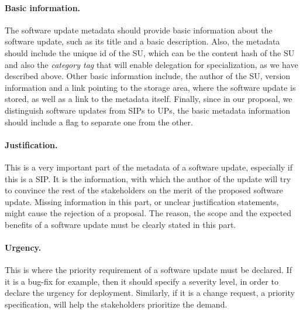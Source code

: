 \paragraph{Basic information.}The software update metadata should provide basic information about the software update, such as its title and a basic description. Also, the metadata should include the unique id of the SU, which can be the content hash of the SU and also the \emph{category tag} that will enable delegation for specialization, as we have described above. Other basic information include, the author of the SU, version information and a link pointing to the storage area, where the software update is stored, as well as a link to the metadata itself. Finally, since in our proposal, we distinguish software updates from SIPs to UPs, the basic metadata information should include a flag to separate one from the other.
\paragraph{Justification.} This is a very important part of the metadata of a software update, especially if this is a SIP. It is the information, with which the author of the update will try to convince the rest of the stakeholders on the merit of the proposed software update. Missing information in this part, or unclear justification statements, might cause the rejection of a proposal. The reason, the scope and the expected benefits of a software update must be clearly stated in this part.
\paragraph{Urgency.} This is where the priority requirement of a software update must be declared. If it is a bug-fix for example, then it should specify a severity level, in order to declare the urgency for deployment. Similarly, if it is a change request, a priority specification, will help the stakeholders prioritize the demand.
